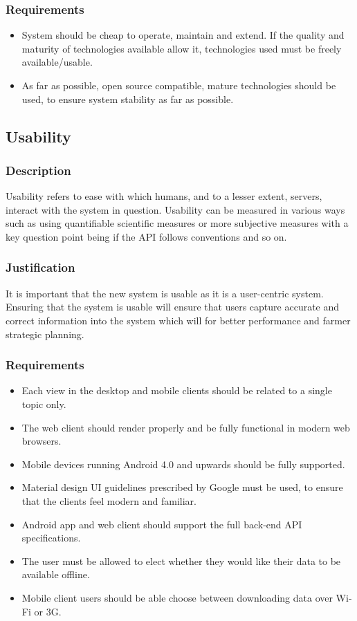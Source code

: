 \documentclass[11pt,fleqn]{book} %
\begin{document}
			\subsubsection{Requirements}
				\begin{itemize}
					\item System should be cheap to operate, maintain and extend. If the quality and maturity of technologies available allow it, technologies used must be freely available/usable.
					\item As far as possible, open source compatible, mature technologies should be used, to ensure system stability as far as possible.
				\end{itemize}
		\subsection{Usability}
			\subsubsection{Description}
				Usability refers to ease with which humans, and to a lesser extent, servers, interact with the system in question. Usability can be measured in various ways such as using quantifiable scientific measures or more subjective measures with a key question point being if the API follows conventions and so on.
			\subsubsection{Justification}
				It is important that the new system is usable as it is a user-centric system. Ensuring that the system is usable will ensure that users capture accurate and correct information into the system which will for better performance and farmer strategic planning.
			\subsubsection{Requirements}
				\begin{itemize}
					\item Each view in the desktop and mobile clients should be related to a single topic only.
					\item The web client should render properly and be fully functional in modern web browsers.
					\item Mobile devices running Android 4.0 and upwards should be fully supported.
					\item Material design UI guidelines prescribed by Google must be used, to ensure that the clients feel modern and familiar.
					\item Android app and web client should support the full back-end API specifications.
					\item The user must be allowed to elect whether they would like their data to be available offline.
					\item Mobile client users should be able choose between downloading data over Wi-Fi or 3G.
				\end{itemize}
		
\end{document}
